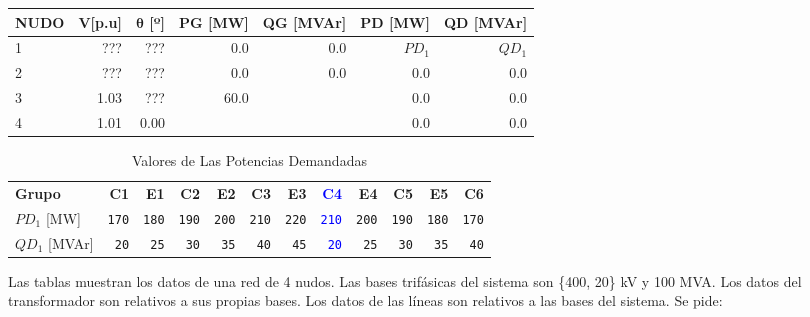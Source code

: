 \documentclass[a4paper,10pt,titlepage,oneside]{article}
\begin{document}
\setlength{\extrarowheight}{4pt}
{\setlength{\arrayrulewidth}{1pt}
\begin{table}[htbp]
            \centering
\begin{tabular}[t]{|l|r|r|r|r|r|r|}
\hline \textbf{NUDO} & \textbf{V[p.u]} & $\mathbf{\theta}$ \textbf{[º]} & \textbf{PG [MW]} & \textbf{QG [MVAr]} & \textbf{PD [MW]}& \textbf{QD [MVAr]}\\ 
\hline 1 & ??? & ??? & 0.0 & 0.0 & $PD_1$ & $QD_1$ \\ 
\hline 2 & ??? & ??? & 0.0& 0.0 & 0.0 & 0.0 \\
\cline{1-3} 3 & 1.03 & ??? & 60.0 & \cellcolor[gray]{0.6} & 0.0 & 0.0 \\
\hline 4 & 1.01 &0.00 &\cellcolor[gray]{0.6} & \cellcolor[gray]{0.6}& 0.0 & 0.0 \\
\hline
\end{tabular}
\end{table}

\begin{table}[htbp]
        \centering
            \begin{tabular}[t]{l r r r r r r r r r r r }
                    \textbf{Grupo} &\textbf{C1}& \textbf{E1}& \textbf{C2}& \textbf{E2}& \textbf{C3}& \textbf{E3}& \textbf{\textcolor{blue}{C4}}& \textbf{E4}& \textbf{C5}& \textbf{E5}& \textbf{C6}\\
                    \cline{1-12}
                     $PD_1$ [MW] &\texttt{170}& \texttt{180}& \texttt{190} &\texttt{200}& \texttt{210}& \texttt{220} &\textcolor{blue}{\texttt{210}} &\texttt{200}& \texttt{190} &\texttt{180} &\texttt{170} \\
                    $QD_1$ [MVAr] & \texttt{20}& \texttt{25}&\texttt{30} &\texttt{35}&\texttt{40}&\texttt{45}&\textcolor{blue}{\texttt{20}}&\texttt{25}&\texttt{30} &\texttt{35}&\texttt{40}
            \end{tabular}
        \caption{Valores de Las Potencias Demandadas}
        \label{tab:my_label}
\end{table}

Las tablas muestran los datos de una red de 4 nudos. Las bases trifásicas del sistema son \{400,
20\} kV y 100 MVA. Los datos del transformador son relativos a sus propias bases. Los datos de las
líneas son relativos a las bases del sistema. Se pide: 

}
\end{document}
